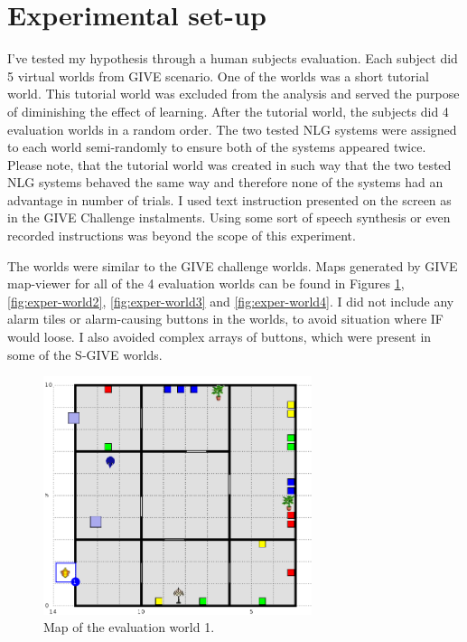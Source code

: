 \section{Experimental set-up}
\label{sec:exper-setup}
I've tested my hypothesis through a human subjects evaluation. Each subject did 5 virtual worlds from GIVE scenario. One of the worlds was a short tutorial world. This tutorial world was excluded from the analysis and served the purpose of diminishing the effect of learning. After the tutorial world, the subjects did 4 evaluation worlds in a random order. The two tested NLG systems were assigned to each world semi-randomly to ensure both of the systems appeared twice. Please note, that the tutorial world was created in such way that the two tested NLG systems behaved the same way and therefore none of the systems had an advantage in number of trials. I used text instruction presented on the screen as in the GIVE Challenge instalments. Using some sort of speech synthesis or even recorded instructions was beyond the scope of this experiment.

The worlds were similar to the GIVE challenge worlds. Maps generated by GIVE map-viewer for all of the 4 evaluation worlds can be found in Figures \ref{fig:exper-world1}, \ref{fig:exper-world2}, \ref{fig:exper-world3} and \ref{fig:exper-world4}. I did not include any alarm tiles or alarm-causing buttons in the worlds, to avoid situation where IF would loose. I also avoided complex arrays of buttons, which were present in some of the S-GIVE worlds.

\begin{figure}[!htbp]
  \centering
	\includegraphics[width=0.7\textwidth]{Images/experiment-world-2}
	\caption{Map of the evaluation world 1.}
	\label{fig:exper-world1}
\end{figure}

